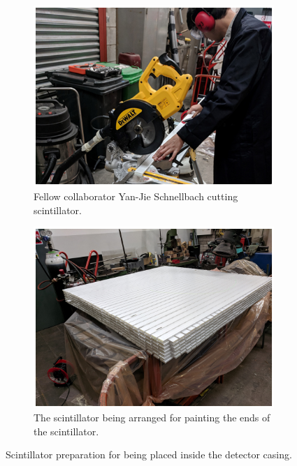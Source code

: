 \begin{figure}[htbp]
\centering
\begin{subfigure}{.5\textwidth}
  \centering
  \includegraphics[width=\linewidth]{Chapter3/Figs/Raster/detCon003bb_CuttingScint.png}
  \captionsetup{width=.9\linewidth}
  \caption{Fellow collaborator Yan-Jie Schnellbach cutting scintillator.}
  \label{subFig:detCon003bb_CuttingScint}
\end{subfigure}%
\begin{subfigure}{.5\textwidth}
  \centering
  \includegraphics[width=\linewidth]{Chapter3/Figs/Raster/detCon005b_PaintingEnds.png}
  \captionsetup{width=.9\linewidth}
  \caption{The scintillator being arranged for painting the ends of the scintillator.}
  \label{subFig:detCon005b_PaintingEnds}
\end{subfigure}
\caption{Scintillator preparation for being placed inside the detector casing.}
\label{fig:detCon_CuttingScint_PaintingEnds}
\end{figure}

